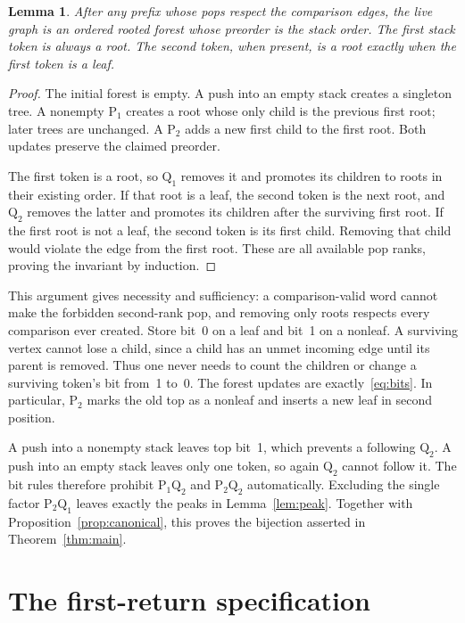 \documentclass[11pt,a4paper]{article}
\newtheorem{lemma}[theorem]{Lemma}
\theoremstyle{remark}
\newcommand{\PP}{\mathrm{P}}
\newcommand{\QQ}{\mathrm{Q}}
\begin{document}
\begin{lemma}\label{lem:forest}
After any prefix whose pops respect the comparison edges, the live
graph is an ordered rooted forest whose preorder is the stack order.
The first stack token is always a root. The second token, when present,
is a root exactly when the first token is a leaf.
\end{lemma}
\begin{proof}
The initial forest is empty. A push into an empty stack creates a
singleton tree. A nonempty $\PP_1$ creates a root whose only child is
the previous first root; later trees are unchanged. A $\PP_2$ adds a new
first child to the first root. Both updates preserve the claimed preorder.

The first token is a root, so $\QQ_1$ removes it and promotes its children
to roots in their existing order. If that root is a leaf, the second
token is the next root, and $\QQ_2$ removes the latter and promotes its
children after the surviving first root. If the first root is not a leaf,
the second token is its first child. Removing that child would violate
the edge from the first root. These are all available pop ranks, proving
the invariant by induction.
\end{proof}

This argument gives necessity and sufficiency: a comparison-valid word
cannot make the forbidden second-rank pop, and removing only roots
respects every comparison ever created. Store bit~0 on a leaf and bit~1
on a nonleaf. A surviving vertex cannot lose a child, since a child has
an unmet incoming edge until its parent is removed. Thus one never needs
to count the children or change a surviving token's bit from~1 to~0.
The forest updates are exactly~\eqref{eq:bits}. In particular, $\PP_2$
marks the old top as a nonleaf and inserts a new leaf in second position.

A push into a nonempty stack leaves top bit~1, which prevents a following
$\QQ_2$. A push into an empty stack leaves only one token, so again
$\QQ_2$ cannot follow it. The bit rules therefore prohibit
$\PP_1\QQ_2$ and $\PP_2\QQ_2$ automatically. Excluding the single factor
$\PP_2\QQ_1$ leaves exactly the peaks in Lemma~\ref{lem:peak}.
Together with Proposition~\ref{prop:canonical}, this proves the bijection
asserted in Theorem~\ref{thm:main}.

\section{The first-return specification}\label{sec:grammar}
\end{document}
